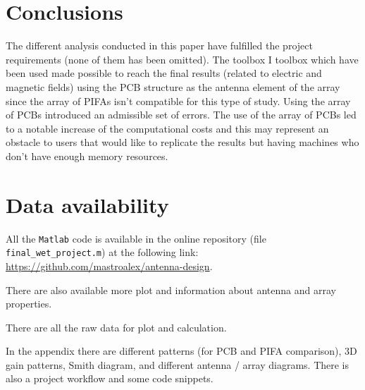 \documentclass[10 pt,a4paper,twocolumn]{article}
\begin{document}
{\section*{Conclusions}
The different analysis conducted in this paper have fulfilled the project requirements (none of them has been omitted). 
The toolbox
I toolbox which have been used made possible to reach the final results (related to electric and magnetic fields) using the PCB structure as the antenna element of the array since the array of PIFAs isn't compatible for this type of study. Using the array of PCBs introduced an admissible set of errors. The use of the array of PCBs led to a notable increase of the computational costs  and this may represent an obstacle to users that would like to replicate the results but having machines who don't have enough memory resources. 

\section*{Data availability}

All the \texttt{Matlab} code is available in the online repository (file 	\colorbox{backcolour}{\texttt{final\_wet\_project.m}}) at the following link: \url{https://github.com/mastroalex/antenna-design}.

There are also available more plot and information about antenna and array properties. 

There are all the raw data for plot and calculation.

In the appendix there are different patterns (for PCB and PIFA comparison), 3D gain patterns, Smith diagram, and different antenna / array diagrams. There is also a project workflow and some code snippets. 

\printbibliography

\pagebreak
\appendix

	

}
\end{document}
